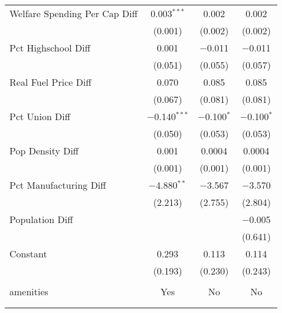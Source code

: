 \begin{table}[!htbp]
\begin{tabular}{@{\extracolsep{5pt}}lccc}
  Welfare Spending Per Cap Diff & 0.003$^{***}$ & 0.002 & 0.002 \\ 
  & (0.001) & (0.002) & (0.002) \\ 
  Pct Highschool Diff & 0.001 & $-$0.011 & $-$0.011 \\ 
  & (0.051) & (0.055) & (0.057) \\ 
  Real Fuel Price Diff & 0.070 & 0.085 & 0.085 \\ 
  & (0.067) & (0.081) & (0.081) \\ 
  Pct Union Diff & $-$0.140$^{***}$ & $-$0.100$^{*}$ & $-$0.100$^{*}$ \\ 
  & (0.050) & (0.053) & (0.053) \\ 
  Pop Density Diff & 0.001 & 0.0004 & 0.0004 \\ 
  & (0.001) & (0.001) & (0.001) \\ 
  Pct Manufacturing Diff & $-$4.880$^{**}$ & $-$3.567 & $-$3.570 \\ 
  & (2.213) & (2.755) & (2.804) \\ 
  Population Diff &  &  & $-$0.005 \\ 
  &  &  & (0.641) \\ 
  Constant & 0.293 & 0.113 & 0.114 \\ 
  & (0.193) & (0.230) & (0.243) \\ 
 \hline \\[-1.8ex] 
amenities & Yes & No & No \\ 
\hline \\[-1.8ex] 
\hline 
\hline \\[-1.8ex] 
\end{tabular} 
\end{table} 
